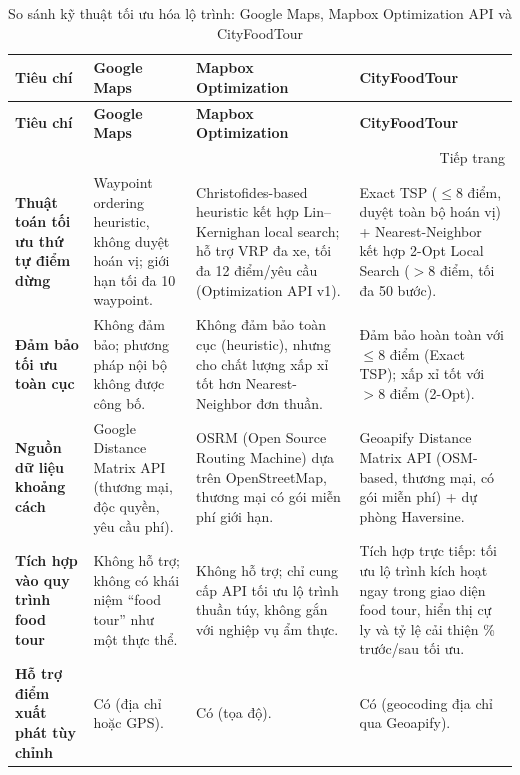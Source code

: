 \begin{longtable}{|p{3cm}|p{3.5cm}|p{3.5cm}|p{3.5cm}|}
\caption{So sánh kỹ thuật tối ưu hóa lộ trình: Google Maps, Mapbox Optimization API và CityFoodTour} \\
\hline
\textbf{Tiêu chí} & \textbf{Google Maps} & \textbf{Mapbox Optimization} & \textbf{CityFoodTour} \\
\hline
\endfirsthead

\hline
\textbf{Tiêu chí} & \textbf{Google Maps} & \textbf{Mapbox Optimization} & \textbf{CityFoodTour} \\
\hline
\endhead

\hline
\multicolumn{4}{r}{Tiếp trang} \\
\endfoot

\hline
\endlastfoot

\textbf{Thuật toán tối ưu thứ tự điểm dừng} &
Waypoint ordering heuristic, không duyệt hoán vị; giới hạn tối đa 10 waypoint. &
Christofides-based heuristic kết hợp Lin–Kernighan local search; hỗ trợ VRP đa xe, tối đa 12 điểm/yêu cầu (Optimization API v1). &
Exact TSP ($\le 8$ điểm, duyệt toàn bộ hoán vị) + Nearest-Neighbor kết hợp 2-Opt Local Search ($> 8$ điểm, tối đa 50 bước). \\ \hline

\textbf{Đảm bảo tối ưu toàn cục} &
Không đảm bảo; phương pháp nội bộ không được công bố. &
Không đảm bảo toàn cục (heuristic), nhưng cho chất lượng xấp xỉ tốt hơn Nearest-Neighbor đơn thuần. &
Đảm bảo hoàn toàn với $\le 8$ điểm (Exact TSP); xấp xỉ tốt với $> 8$ điểm (2-Opt). \\ \hline

\textbf{Nguồn dữ liệu khoảng cách} &
Google Distance Matrix API (thương mại, độc quyền, yêu cầu phí). &
OSRM (Open Source Routing Machine) dựa trên OpenStreetMap, thương mại có gói miễn phí giới hạn. &
Geoapify Distance Matrix API (OSM-based, thương mại, có gói miễn phí) + dự phòng Haversine. \\ \hline

\textbf{Tích hợp vào quy trình food tour} &
Không hỗ trợ; không có khái niệm ``food tour'' như một thực thể. &
Không hỗ trợ; chỉ cung cấp API tối ưu lộ trình thuần túy, không gắn với nghiệp vụ ẩm thực. &
Tích hợp trực tiếp: tối ưu lộ trình kích hoạt ngay trong giao diện food tour, hiển thị cự ly và tỷ lệ cải thiện \% trước/sau tối ưu. \\ \hline

\textbf{Hỗ trợ điểm xuất phát tùy chỉnh} &
Có (địa chỉ hoặc GPS). &
Có (tọa độ). &
Có (geocoding địa chỉ qua Geoapify). \\ \hline


\end{longtable}
